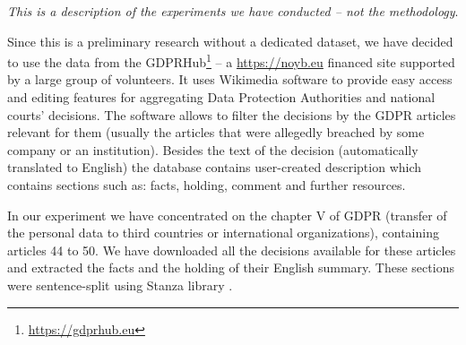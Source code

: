\textit{This is a description of the experiments we have conducted -- not the methodology}.

Since this is a preliminary research without a dedicated dataset, we have decided to use
the data from the GDPRHub\footnote{\url{https://gdprhub.eu}} -- a \url{https://noyb.eu} financed site supported by
a large group of volunteers. It uses Wikimedia software to provide easy access and editing features for 
aggregating Data Protection Authorities and national courts' decisions. The software  allows to filter the 
decisions by the GDPR articles relevant for them (usually the articles that were allegedly breached by some 
company or an institution). Besides the text of the decision (automatically translated to English) the database
contains user-created description which contains sections such as: facts, holding, comment and further resources.

In our experiment we have concentrated on the chapter V of GDPR (transfer of the personal data to third countries or 
international organizations), containing articles 44 to 50. We have downloaded all the decisions available for 
these articles and extracted the facts and the holding of their English summary. These sections were sentence-split
using Stanza library \cite{qi2020stanza}.